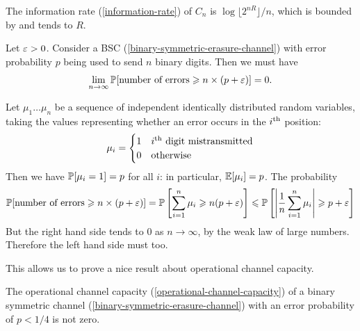 \documentclass{article}
\begin{document}
\begin{note}
	The information rate (\ref{information-rate})
	of $C_n$ is $\log \lfloor2^{nR}\rfloor / n$,
	which is bounded by and tends to $R$.
\end{note}

\begin{proposition}
	\label{error-rate-bound}
    Let $\eps > 0$.
    Consider a BSC (\ref{binary-symmetric-erasure-channel}) with error probability $p$
    being used to send $n$ binary digits. Then we must have
    \[
	\lim_{n \to \infty} \P[\text{number of errors} \geq n \times (p + \eps)] = 0.
	\]
\end{proposition}

\begin{prf}
    Let $\mu_1 \dots \mu_n$
    be a sequence of independent identically distributed random variables,
    taking the values representing whether an error occurs in the $i\th$ position:
    \[
	\mu_i = \begin{cases}
		1 & i\th \text{ digit mistransmitted} \\
		0 & \!\otherwise
	\end{cases}
	\]
	Then we have $\P[\mu_i = 1] = p$ for all $i$:
	in particular, $\E[\mu_i] = p$. The probability
	\[
	\P[\text{number of errors} \geq n \times (p + \eps)] =
	\P \left[ \sum_{i=1}^n \mu_i \geq n(p + \eps)\right] \leq
	\P \left[ \abs{\frac{1}{n} \sum_{i=1}^n \mu_i} \geq p + \eps \right]
	\]
	But the right hand side tends to 0 as $n \to \infty$,
	by the weak law of large numbers.
	Therefore the left hand side must too.
\end{prf}

This allows us to prove a nice result about operational channel capacity.

\begin{proposition}
	\label{nonzero-channel-capacity}
    The operational channel capacity (\ref{operational-channel-capacity})
    of a binary symmetric channel (\ref{binary-symmetric-erasure-channel})
    with an error probability of $p < 1/4$ is not zero.
\end{proposition}
\end{document}
